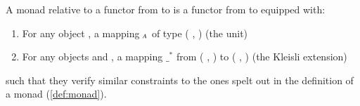 \begin{definition}
\label{def:relative-monad}
A monad relative to a functor  from  to 
is a functor  from  to  equipped with:
\begin{enumerate}
  \item For any object , a mapping $_{\AB{A}}$ of type
    {( ,  )} (the unit)
  \item For any objects  and , a mapping $\_^*$
    from {( ,  )}
    to {( ,  )} (the Kleisli extension)
\end{enumerate}

such that they verify similar constraints to the ones spelt out in the
definition of a monad (\ref{def:monad}).
\end{definition}
